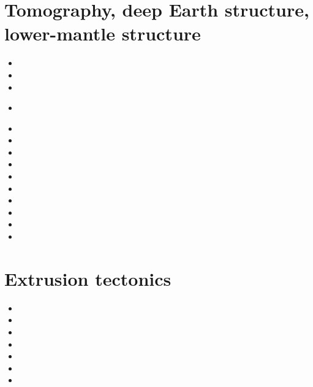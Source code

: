 \section{Tomography, deep Earth structure, lower-mantle structure}
\begin{small}
\begin{itemize}
\item[\nineteeneightyone] 
\item[\nineteenninetyone] 
\item[\nineteenninetythree] 
\item[\nineteenninetyeight] 
 \\
\item[\twothousandnine] 
\item[\twothousandthree] 
\item[\twothousandten] 
\item[\twothousandeleven]
\item[\twothousandtwelve]
\item[\twothousandthirteen] 
\item[\twothousandsixteen] 
\item[\twothousandeighteen] 
\item[\twothousandtwenty] 
\item[\twothousandtwentythree] 
\end{itemize}
\end{small}


\section{Extrusion tectonics}

\begin{small}
\begin{itemize}
\item[\nineteeneightytwo]
\item[\twothousandthree]
\item[\twothousandeleven]
\item[\twothousandfourteen]
\item[\twothousandsixteen]
\item[\twothousandnineteen]
\item[\twothousandtwentyone]
\end{itemize}
\end{small}


